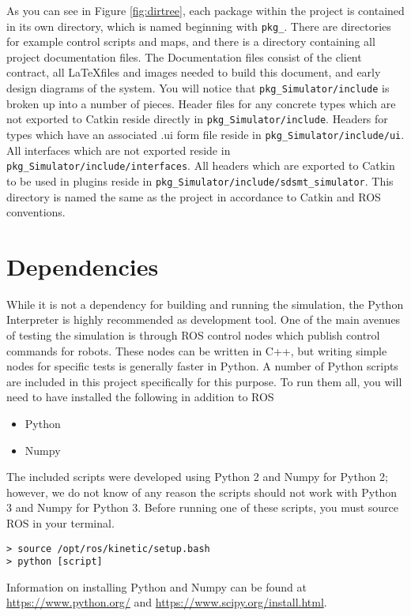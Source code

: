 As you can see in Figure \ref{fig:dirtree}, each package within the project is contained in its own directory, which is named beginning with \lstinline|pkg_|. There are directories for example control scripts and maps, and there is a directory containing all project documentation files. The Documentation files consist of the client contract, all \LaTeX files and images needed to build this document, and early design diagrams of the system.
You will notice that \lstinline|pkg_Simulator/include| is broken up into a number of pieces. Header files for any concrete types which are not exported to Catkin reside directly in \lstinline|pkg_Simulator/include|. Headers for types which have an associated .ui form file reside in \lstinline|pkg_Simulator/include/ui|. All interfaces which are not exported reside in \lstinline|pkg_Simulator/include/interfaces|. All headers which are exported to Catkin to be used in plugins reside in \lstinline|pkg_Simulator/include/sdsmt_simulator|. This directory is named the same as the project in accordance to Catkin and ROS conventions.

\section{Dependencies}
While it is not a dependency for building and running the simulation, the Python Interpreter is highly recommended as development tool. One of the main avenues of testing the simulation is through ROS control nodes which publish control commands for robots. These nodes can be written in C++, but writing simple nodes for specific tests is generally faster in Python. A number of Python scripts are included in this project specifically for this purpose. To run them all, you will need to have installed the following in addition to ROS
\begin{itemize}
	\item Python
	\item Numpy
\end{itemize}
The included scripts were developed using Python 2 and Numpy for Python 2; however, we do not know of any reason the scripts should not work with Python 3 and Numpy for Python 3.
Before running one of these scripts, you must source ROS in your terminal.
\begin{lstlisting}
> source /opt/ros/kinetic/setup.bash
> python [script]
\end{lstlisting}

Information on installing Python and Numpy can be found at \url{https://www.python.org/} and \url{https://www.scipy.org/install.html}.

